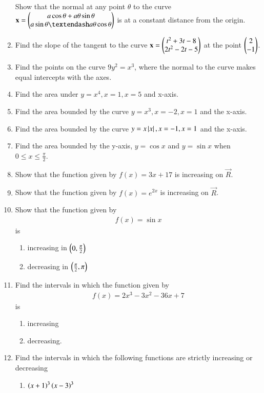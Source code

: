 \begin{enumerate}[label=\arabic*.,ref=\thesubsection.\theenumi]
%
Show that the normal at any point $\theta$ to the curve $\vec{x} = \myvec{a \cos\theta + a \theta \sin\theta\\  a \sin\theta – a\theta \cos\theta}$ is at a constant distance from the origin.
%
\item Find the slope of the tangent to the curve $\mathbf{x} = \begin{pmatrix}t^2+3t-8 \\ 2t^2-2t-5\end{pmatrix}$
at the point $\begin{pmatrix}2\\-1\end{pmatrix}$.
\item Find the points on the curve $9y^2 = x^3$, where the normal to the curve makes equal intercepts with the axes.
\item Find the area under $y = x^4, x = 1, x = 5$ and x-axis.
%
\item Find the area bounded by the curve $y = x^3, x =-2, x = 1$ and the x-axis.
\item Find the area bounded by the curve $y = x \left\vert x\right\vert, x = -1, x = 1$ and the x-axis.
\item Find the area bounded by the y-axis, $y = \cos x$ and $y = \sin x$ when $0 \le x \le \frac{\pi}{2}$.\item Show that the function given by $f(x) = 3x+17$  is increasing on $\vec{R}$.
\item Show that the function given by $f(x) = e^{2x}$  is increasing on $\vec{R}$.
%
%
\item Show that the function given by 
\begin{align}
f(x)  = \sin x
\end{align}
%
is 
\begin{enumerate}
\item increasing in $\left(0,\frac{\pi}{2}\right)$
\item decreasing in $\left(\frac{\pi}{2}, \pi\right)$
\end{enumerate}
%
%
\item Find the intervals in which the function given by 
\begin{align}
f(x)  = 2x^3-3x^2 - 36x +7
\end{align}
%
is 
\begin{enumerate}
\item increasing
\item decreasing.
\end{enumerate}
%
\item Find the intervals in which the following functions are strictly increasing or decreasing
%
\begin{enumerate}
\item $\left(x+1\right)^3\left(x-3\right)^3$

\end{enumerate}
\end{enumerate}
